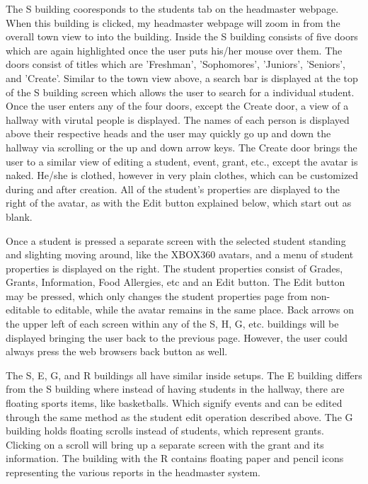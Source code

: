\documentclass[11pt]{article}
\begin{document}
The S building cooresponds to the students tab on the headmaster webpage. When this building is clicked, my headmaster webpage will zoom in from the overall town view to into the building. Inside the S building consists of five doors which are again highlighted once the user puts his/her mouse over them. The doors consist of titles which are 'Freshman', 'Sophomores', 'Juniors', 'Seniors', and 'Create'. Similar to the town view above, a search bar is displayed at the top of the S building screen which allows the user to search for a individual student. Once the user enters any of the four doors, except the Create door, a view of a hallway with virutal people is displayed. The names of each person is displayed above their respective heads and the user may quickly go up and down the hallway via scrolling or the up and down arrow keys. The Create door brings the user to a similar view of editing a student, event, grant, etc., except the avatar is naked. He/she is clothed, however in very plain clothes, which can be customized during and after creation. All of the student's properties are displayed to the right of the avatar, as with the Edit button explained below, which start out as blank.

Once a student is pressed a separate screen with the selected student standing and slighting moving around, like the XBOX360 avatars, and a menu of student properties is displayed on the right. The student properties consist of Grades, Grants, Information, Food Allergies, etc and an Edit button. The Edit button may be pressed, which only changes the student properties page from non-editable to editable, while the avatar remains in the same place. Back arrows on the upper left of each screen within any of the S, H, G, etc. buildings will be displayed bringing the user back to the previous page. However, the user could always press the web browsers back button as well.

The S, E, G, and R buildings all have similar inside setups. The E building differs from the S building where instead of having students in the hallway, there are floating sports items, like basketballs. Which signify events and can be edited through the same method as the student edit operation described above. The G building holds floating scrolls instead of students, which represent grants. Clicking on a scroll will bring up a separate screen with the grant and its information. The building with the R contains floating paper and pencil icons representing the various reports in the headmaster system. 
\end{document}
